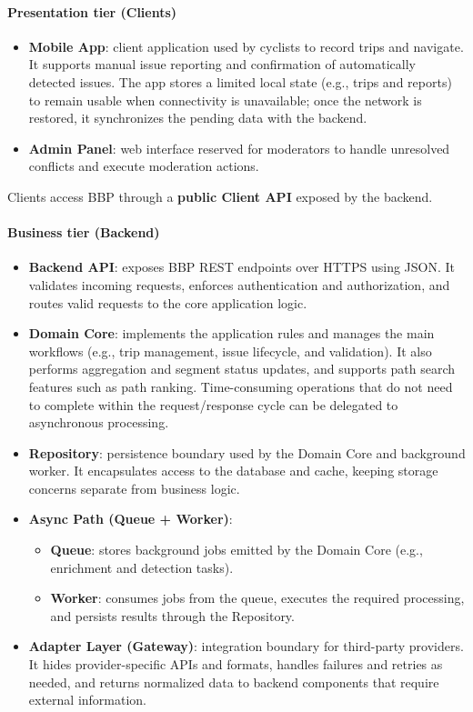 \paragraph{Presentation tier (Clients)}
\begin{itemize}
	\item \textbf{Mobile App}: client application used by cyclists to record trips and navigate. It supports manual issue reporting and confirmation of automatically detected issues. The app stores a limited local state (e.g., trips and reports) to remain usable when connectivity is unavailable; once the network is restored, it synchronizes the pending data with the backend.
	\item \textbf{Admin Panel}: web interface reserved for moderators to handle unresolved conflicts and execute moderation actions.
\end{itemize}
Clients access BBP through a \textbf{public Client API} exposed by the backend.

\paragraph{Business tier (Backend)}
\begin{itemize}
	\item \textbf{Backend API}: exposes BBP REST endpoints over HTTPS using JSON. It validates incoming requests, enforces authentication and authorization, and routes valid requests to the core application logic.
	\item \textbf{Domain Core}: implements the application rules and manages the main workflows (e.g., trip management, issue lifecycle, and validation). It also performs aggregation and segment status updates, and supports path search features such as path ranking. Time-consuming operations that do not need to complete within the request/response cycle can be delegated to asynchronous processing.
	\item \textbf{Repository}: persistence boundary used by the Domain Core and background worker. It encapsulates access to the database and cache, keeping storage concerns separate from business logic.
	\item \textbf{Async Path (Queue + Worker)}:
	\begin{itemize}
		\item \textbf{Queue}: stores background jobs emitted by the Domain Core (e.g., enrichment and detection tasks).
		\item \textbf{Worker}: consumes jobs from the queue, executes the required processing, and persists results through the Repository.
	\end{itemize}
	\item \textbf{Adapter Layer (Gateway)}: integration boundary for third-party providers. It hides provider-specific APIs and formats, handles failures and retries as needed, and returns normalized data to backend components that require external information.
\end{itemize}


